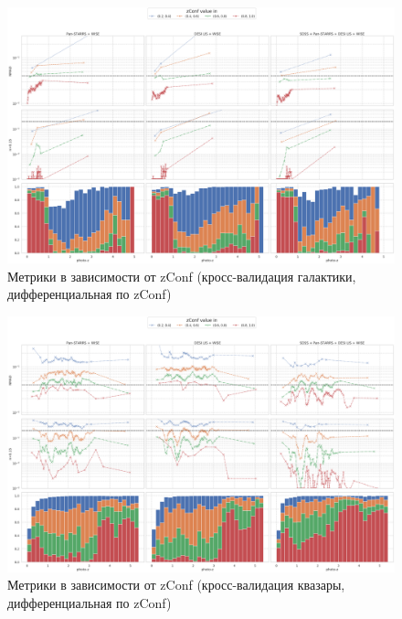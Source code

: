 \documentclass[fleqn,usenatbib]{mnras}
\begin{document}
\begin{figure}
    \centering
    \includegraphics[width=0.99\linewidth]{images/metrics-zconf-cv2-gal-log.png}
    \caption{Метрики в зависимости от zConf (кросс-валидация галактики, дифференциальная по zConf)}
    \label{fig:metrics-zconf-cv2}
\end{figure}


\begin{figure}
    \centering
    \includegraphics[width=0.99\linewidth]{images/metrics-zconf-cv2-qso-log.png}
    \caption{Метрики в зависимости от zConf (кросс-валидация квазары, дифференциальная по zConf)}
    \label{fig:metrics-zconf-cv2}
\end{figure}
\end{document}
